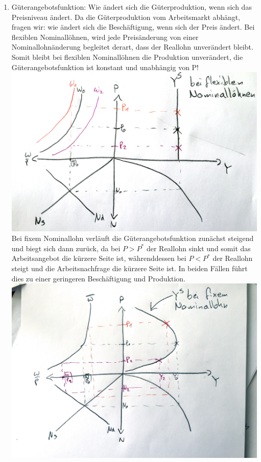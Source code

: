 \documentclass{scrartcl}
\begin{document}
\begin{enumerate}
\item G\"{u}terangebotsfunktion: Wie \"{a}ndert sich die G\"{u}terproduktion, wenn sich das Preisniveau \"{a}ndert. Da die G\"{u}terproduktion vom Arbeitsmarkt abh\"{a}ngt, fragen wir: wie \"{a}ndert sich die Besch\"{a}ftigung, wenn sich der Preis \"{a}ndert. Bei flexiblen Nominall\"{o}hnen, wird jede Preis\"{a}nderung von einer Nominallohn\"{a}nderung begleitet derart, dass der Reallohn unver\"{a}ndert bleibt. Somit bleibt bei flexiblen Nominall\"{o}hnen die Produktion unver\"{a}ndert, die G\"{u}terangebotsfunktion ist konstant und unabh\"{a}ngig von P!\\
    \includegraphics[width=\textwidth]{Bilder/Klassik_AS_Flex.pdf}\\
    Bei fixem Nominallohn verl\"{a}uft die G\"{u}terangebotsfunktion zun\"{a}chst steigend und biegt sich dann zur\"{u}ck, da bei $P>P^*$ der Reallohn sinkt und somit das Arbeitsangebot die k\"{u}rzere Seite ist, w\"{a}hrenddessen bei $P<P^*$ der Reallohn steigt und die Arbeitsnachfrage die k\"{u}rzere Seite ist. In beiden F\"{a}llen f\"{u}hrt dies zu einer geringeren Besch\"{a}ftigung und Produktion.\\
    \includegraphics[width=\textwidth]{Bilder/Klassik_AS_Fix.pdf}\\


\end{enumerate}
\end{document}
